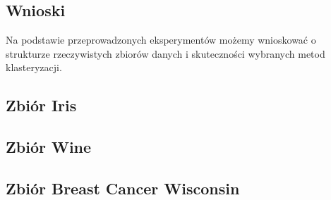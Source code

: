 \documentclass[12pt]{article}
\begin{document}
\subsection*{Wnioski}

Na podstawie przeprowadzonych eksperymentów możemy wnioskować o strukturze rzeczywistych zbiorów danych i skuteczności wybranych metod klasteryzacji.

\subsection*{Zbiór Iris}

\subsection*{Zbiór Wine}

\subsection*{Zbiór Breast Cancer Wisconsin}
\end{document}
